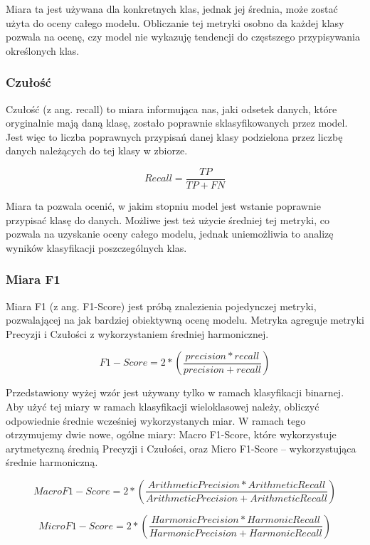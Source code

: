 Miara ta jest używana dla konkretnych klas, jednak jej średnia, może zostać użyta do oceny całego modelu. Obliczanie tej metryki osobno da każdej klasy pozwala na ocenę, czy model nie wykazuję tendencji do częstszego przypisywania określonych klas. 

\subsubsection{Czułość}
Czułość (z ang. recall) to miara informująca nas, jaki odsetek danych, które oryginalnie mają daną klasę, zostało poprawnie sklasyfikowanych przez model. Jest więc to liczba poprawnych przypisań danej klasy podzielona przez liczbę danych należących do tej klasy w zbiorze. \cite{grandini2020metrics}


$$Recall  = \frac{TP}{TP+FN}$$


Miara ta pozwala ocenić, w jakim stopniu model jest wstanie poprawnie przypisać klasę do danych. Możliwe jest też użycie średniej tej metryki, co pozwala na uzyskanie oceny całego modelu, jednak uniemożliwia to analizę wyników klasyfikacji poszczególnych klas.

\subsubsection{Miara F1}
Miara F1 (z ang. F1-Score) jest próbą znalezienia pojedynczej metryki, pozwalającej na jak bardziej obiektywną ocenę modelu. Metryka agreguje metryki Precyzji i Czułości \newline z wykorzystaniem średniej harmonicznej. \cite{grandini2020metrics}


$$F1-Score= 2*(\frac{precision*recall}{precision+recall})$$


Przedstawiony wyżej wzór jest używany tylko w ramach klasyfikacji binarnej. Aby użyć tej miary w ramach klasyfikacji wieloklasowej należy, obliczyć odpowiednie średnie wcześniej wykorzystanych miar. W ramach tego otrzymujemy dwie nowe, ogólne miary: Macro F1-Score, które wykorzystuje arytmetyczną średnią Precyzji i Czułości, oraz Micro F1-Score – wykorzystująca średnie harmoniczną.\cite{grandini2020metrics}


$$Macro F1-Score= 2*(\frac{Arithmetic Precision* Arithmetic Recall}{Arithmetic Precision+Arithmetic Recall})$$


$$ Micro F1-Score= 2*(\frac{Harmonic Precision* Harmonic Recall}{Harmonic Precision+Harmonic Recall})$$
\clearpage